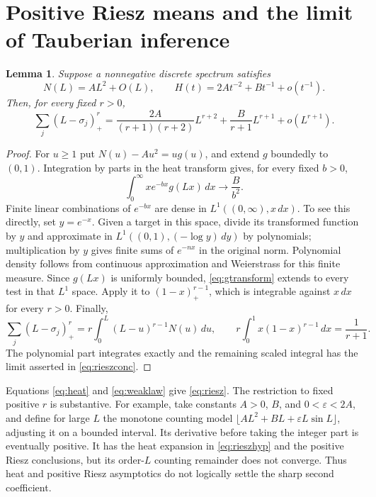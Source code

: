 \documentclass[11pt]{amsart}
\numberwithin{equation}{section}
\newtheorem{lemma}[theorem]{Lemma}
\theoremstyle{remark}
\begin{document}
\section{Positive Riesz means and the limit of Tauberian inference}\label{sec:tauberian}

\begin{lemma}\label{lem:riesz}
Suppose a nonnegative discrete spectrum satisfies
\begin{equation}\label{eq:rieszhyp}
N(L)=AL^2+O(L),\qquad H(t)=2At^{-2}+Bt^{-1}+o(t^{-1}) .
\end{equation}
Then, for every fixed $r>0$,
\begin{equation}\label{eq:rieszconc}
\sum_j(L-\sigma_j)_+^r=\frac{2A}{(r+1)(r+2)}L^{r+2}+\frac{B}{r+1}L^{r+1}+o(L^{r+1}) .
\end{equation}
\end{lemma}

\begin{proof}
For $u\ge1$ put $N(u)-Au^2=ug(u)$, and extend $g$ boundedly to $(0,1)$. Integration by parts in the heat transform gives, for every fixed $b>0$,
\begin{equation}\label{eq:gtransform}
\int_0^\infty xe^{-bx}g(Lx)\,dx\longrightarrow\frac{B}{b^2} .
\end{equation}
Finite linear combinations of $e^{-bx}$ are dense in $L^1((0,\infty),x\,dx)$. To see this directly, set $y=e^{-x}$. Given a target in this space, divide its transformed function by $y$ and approximate in $L^1((0,1),(-\log y)\,dy)$ by polynomials; multiplication by $y$ gives finite sums of $e^{-nx}$ in the original norm. Polynomial density follows from continuous approximation and Weierstrass for this finite measure. Since $g(Lx)$ is uniformly bounded, \eqref{eq:gtransform} extends to every test in that $L^1$ space. Apply it to $(1-x)_+^{r-1}$, which is integrable against $x\,dx$ for every $r>0$. Finally,
\begin{equation}\label{eq:rieszid}
\sum_j(L-\sigma_j)_+^r=r\int_0^L(L-u)^{r-1}N(u)\,du,\qquad r\int_0^1x(1-x)^{r-1}\,dx=\frac1{r+1} .
\end{equation}
The polynomial part integrates exactly and the remaining scaled integral has the limit asserted in \eqref{eq:rieszconc}.
\end{proof}

Equations \eqref{eq:heat} and \eqref{eq:weaklaw} give \eqref{eq:riesz}. The restriction to fixed positive $r$ is substantive. For example, take constants $A>0$, $B$, and $0<\varepsilon<2A$, and define for large $L$ the monotone counting model $\lfloor AL^2+BL+\varepsilon L\sin L\rfloor$, adjusting it on a bounded interval. Its derivative before taking the integer part is eventually positive. It has the heat expansion in \eqref{eq:rieszhyp} and the positive Riesz conclusions, but its order-$L$ counting remainder does not converge. Thus heat and positive Riesz asymptotics do not logically settle the sharp second coefficient.
\end{document}
